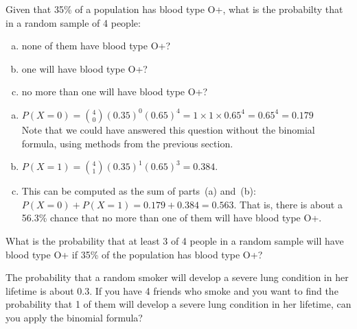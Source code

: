 \begin{examplewrap}
\begin{nexample}
{Given that 35\% of a population has blood type O+, what is the probabilty that in a random sample of 4 people:  
\begin{enumerate}[(a)]
\setlength{\itemsep}{0mm}
\item
    none of them have blood type O+?
\item
    one will have blood type O+?
\item
    no more than one will have blood type O+?
\end{enumerate}
}
\begin{enumerate}[(a)]
\item
  $P(X=0)
    = {4 \choose 0} (0.35)^0 (0.65)^4
    = 1\times1\times 0.65^4 = 0.65^4
    = 0.179$\\
Note that we could have answered this question without the binomial formula, using methods from the previous section.
\item 
  $P(X=1)
    = {4 \choose 1} (0.35)^1(0.65)^{3}
    = 0.384$.
  \item This can be computed as the sum of parts~(a) and~(b):
  $P(X=0) + P(X=1) = 0.179 + 0.384 = 0.563$.
  That is, there is about a 56.3\% chance that no more than
  one of them will have blood type O+.
\end{enumerate}
\label{bloodTypeOPos}
\end{nexample}
\end{examplewrap}


\begin{exercisewrap}
\begin{nexercise}
What is the probability that at least 3 of 4 people in a random sample will have blood type O+ if 35\% of the population has blood type O+?\footnotemark
\end{nexercise}
\end{exercisewrap}


 \begin{exercisewrap}
\begin{nexercise}
The probability that a random smoker will develop a severe
lung condition in her lifetime is about $0.3$.
If you have 4 friends who smoke and you want to find the probability that 1 of them will develop a severe lung condition in her lifetime, can you apply the binomial formula?\footnotemark
\end{nexercise}
\end{exercisewrap}

